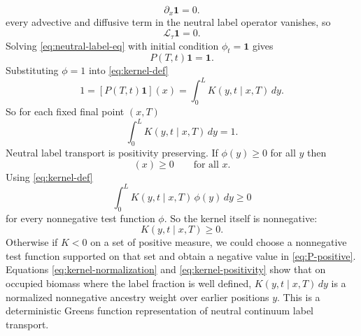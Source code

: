 \documentclass[11pt,a4paper]{report}
\begin{document}
	\begin{equation}
		\partial_x \mathbf 1 =0 .
	\end{equation}
	every advective and diffusive term in the neutral label operator vanishes, so
	\begin{equation}
		\mathcal L_\tau \mathbf 1 =0 .
		\label{eq:L-one-zero}
	\end{equation}
	Solving \eqref{eq:neutral-label-eq} with initial condition
	\(\phi_t=\mathbf 1\) gives
	\begin{equation}
		P(T,t)\mathbf 1=\mathbf 1 .
		\label{eq:P-preserves-one}
	\end{equation}
	Substituting \(\phi = 1\) into
	\eqref{eq:kernel-def}
	\begin{equation}
		1
		=
		[P(T,t)\mathbf 1](x)
		=
		\int_0^L K(y,t\mid x,T)\,dy .
	\end{equation}
	So for each fixed final point \((x,T)\)
	\begin{equation}
		\int_0^L K(y,t\mid x,T)\,dy=1 .
		\label{eq:kernel-normalization}
	\end{equation}
	Neutral label transport is positivity preserving. If
	\(\phi(y)\ge 0\) for all \(y\) then
	\begin{equation}
		[P(T,t)\phi](x)\ge 0
		\qquad\text{for all }x .
		\label{eq:P-positive}
	\end{equation}
	Using \eqref{eq:kernel-def}
	\begin{equation}
		\int_0^L K(y,t\mid x,T)\,\phi(y)\,dy \ge 0
	\end{equation}
	for every nonnegative test function \(\phi\). So the kernel itself
	is nonnegative:
	\begin{equation}
		K(y,t\mid x,T)\ge 0 .
		\label{eq:kernel-positivity}
	\end{equation}
	Otherwise if \(K<0\) on a set of positive measure, we could choose a
	nonnegative test function supported on that set and obtain a negative value in
	\eqref{eq:P-positive}.\\
	Equations \eqref{eq:kernel-normalization} and
	\eqref{eq:kernel-positivity} show that on occupied biomass where the label
	fraction is well defined, \(K(y,t\mid x,T)\,dy\) is a normalized nonnegative
	ancestry weight over earlier positions \(y\). This is a deterministic
	Greens function representation of neutral continuum label transport.	
\end{document}
